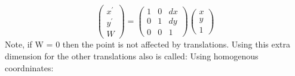 		\begin{equation}
			\begin{pmatrix} x^{\prime} \\ y^{\prime} \\ W \end{pmatrix} =
			\begin{pmatrix} 1& 0& dx \\ 0& 1& dy \\ 0& 0& 1 \end{pmatrix} 
			\begin{pmatrix} x \\ y \\ 1 \end{pmatrix}
		\end{equation}
	Note, if W = 0 then the point is not affected by translations. Using this extra dimension for the other translations also is called: Using homogenous coordninates:


